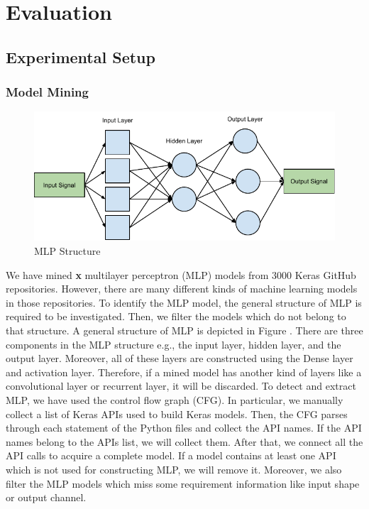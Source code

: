 \section{Evaluation}
\label{sec:evaluation}
\subsection{Experimental Setup}
\subsubsection{\textbf{Model Mining}}
\begin{figure}
	\includegraphics[width=0.8\linewidth]{mlp}
	\centering
	\caption{MLP Structure}
	\label{fig:mlp}
\end{figure}
We have mined {\bf x} multilayer perceptron (MLP) models from 3000 Keras GitHub repositories. However, there are many different kinds of machine learning models in those repositories. To identify the MLP model, the general structure of MLP is required to be investigated. Then, we filter the models which do not belong to that structure.  A general structure of MLP is depicted in Figure . There are three components in the MLP structure e.g., the input layer, hidden layer, and the output layer. Moreover, all of these layers are constructed using the Dense layer and activation layer. Therefore, if a mined model has another kind of layers like a convolutional layer or recurrent layer, it will be discarded. To detect and extract MLP, we have used the control flow graph (CFG). In particular, we manually collect a list of Keras APIs used to build Keras models. Then, the CFG parses through each statement of the Python files and collect the API names. If the API names belong to the APIs list, we will collect them. After that, we connect all the API calls to acquire a complete model. If a model contains at least one API which is not used for constructing MLP, we will remove it. Moreover, we also filter the MLP models which miss some requirement information like input shape or output channel.
